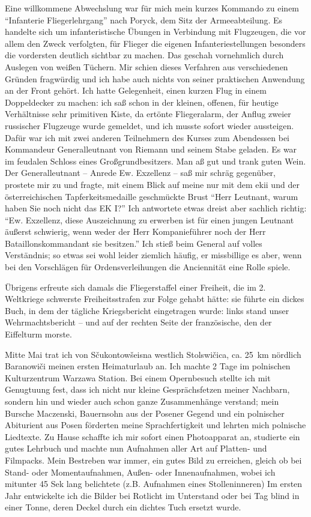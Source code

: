 Eine willkommene Abwechslung war für mich mein kurzes Kommando zu einem \enquote{Infanterie Fliegerlehrgang} nach Poryck, dem Sitz der Armeeabteilung. Es handelte sich um infanteristische Übungen in Verbindung mit Flugzeugen, die vor allem den Zweck verfolgten, für Flieger die eigenen Infanteriestellungen besonders die vordersten deutlich sichtbar zu machen. Das geschah vornehmlich durch Auslegen von weißen Tüchern. Mir schien dieses Verfahren aus verschiedenen Gründen fragwürdig und ich habe auch nichts von seiner praktischen Anwendung an der Front gehört. Ich hatte Gelegenheit, einen kurzen Flug in einem Doppeldecker zu machen: ich saß schon in der kleinen, offenen, für heutige Verhältnisse sehr primitiven Kiste, da ertönte Fliegeralarm, der Anflug zweier russischer Flugzeuge wurde gemeldet, und ich musste sofort wieder aussteigen. Dafür war ich mit zwei anderen Teilnehmern des Kurses zum Abendessen bei Kommandeur Generalleutnant von Riemann und seinem Stabe geladen. Es war im feudalen Schloss eines Großgrundbesitzers. Man aß gut und trank guten Wein. Der Generalleutnant -- Anrede Ew. Exzellenz -- saß mir schräg gegenüber, prostete mir zu und fragte, mit einem Blick auf meine nur mit dem \ac{ekii} und der österreichischen Tapferkeitsmedaille geschmückte Brust \enquote{Herr Leutnant, warum haben Sie noch nicht das EK I?} Ich antwortete etwas dreist aber sachlich richtig: \enquote{Ew. Exzellenz, diese Auszeichnung zu erwerben ist für einen jungen Leutnant äußerst schwierig, wenn weder der Herr Kompanieführer noch der Herr Bataillonskommandant sie besitzen.} Ich stieß beim General auf volles Verständnis; so etwas sei wohl leider ziemlich häufig, er missbillige es aber, wenn bei den Vorschlägen für Ordensverleihungen die Anciennität eine Rolle spiele.

Übrigens erfreute sich damals die Fliegerstaffel einer Freiheit, die im 2. Weltkriege schwerste Freiheitsstrafen zur Folge gehabt hätte: sie führte ein dickes Buch, in dem der tägliche Kriegsbericht eingetragen wurde: links stand unser Wehrmachtsbericht -- und auf der rechten Seite der französische, den der Eiffelturm morste.

Mitte Mai trat ich von Sčukontowšeisna westlich Stolswičica, ca. 25~km nördlich Baranowiči meinen ersten Heimaturlaub an. Ich machte 2 Tage im polnischen Kulturzentrum Warzawa Station. Bei einem Opernbesuch stellte ich mit Genugtuung fest, dass ich nicht nur kleine Gesprächsfetzen meiner Nachbarn, sondern hin und wieder auch schon ganze Zusammenhänge verstand; mein Bursche Maczenski, Bauernsohn aus der Posener Gegend und ein polnischer Abiturient aus Posen förderten meine Sprachfertigkeit und lehrten mich polnische Liedtexte. Zu Hause schaffte ich mir sofort einen Photoapparat an, studierte ein gutes Lehrbuch und machte nun Aufnahmen aller Art auf Platten- und Filmpacks. Mein Bestreben war immer, ein gutes Bild zu erreichen, gleich ob bei Stand- oder Momentaufnahmen, Außen- oder Innenaufnahmen, wobei ich mitunter 45 Sek lang belichtete (z.B. Aufnahmen eines Stolleninneren) Im ersten Jahr entwickelte ich die Bilder bei Rotlicht im Unterstand oder bei Tag blind in einer Tonne, deren Deckel durch ein dichtes Tuch ersetzt wurde.

